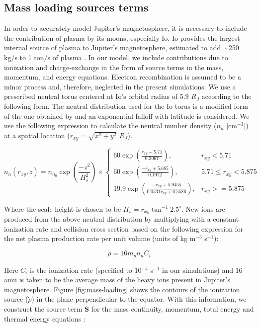 \subsection{Mass loading sources terms}
In order to accurately model Jupiter's magnetosphere, it is necessary to include the contribution of plasma by its moons, especially Io. Io provides the largest internal source of plasma to Jupiter's magnetosphere, estimated to add $\sim$250 kg/s to 1 ton/s of plasma \cite{Bagenal2011b}. In our model, we include contributions due to ionization and charge‐exchange in the form of source terms in the mass, momentum, and energy equations. Electron recombination is assumed to be a minor process and, therefore, neglected in the present simulations. We use a prescribed neutral torus centered at Io's orbital radius of 5.9 $R_J$ according to the following form. The neutral distribution used for the Io torus is a modified form of the one obtained by  and an exponential falloff with latitude is considered. We use the following expression to calculate the neutral number density ($n_n$ [cm$^{-3}$]) at a spatial location ($r_{xy} = \sqrt{x^2 + y^2}$ $R_J$). 

\begin{equation}
    n_n \left(r_{xy}, z\right) = n_{n_0} \exp{\left(\frac{-z^2}{H_s^2}\right)}\times 
    \begin{cases}
        60 \exp\left( \frac{r_{xy} - 5.71}{0.2067}\right), & r_{xy} < 5.71\\
        60 \exp\left( \frac{-r_{xy} + 5.685}{0.1912}\right), &
        5.71 \leq r_{xy} < 5.875\\
        19.9 \exp\left( \frac{-r_{xy} + 5.9455}{0.0531 r_{xy} + 0.5586 }\right), &r_{xy} >= 5.875
    \end{cases}
\end{equation}

Where the scale height is chosen to be $H_s = r_{xy} \tan^{-1}2.5^\circ$. New ions are produced from the above neutral distribution by multiplying with a constant ionization rate and collision cross section based on the following expression for the net plasma production rate per unit volume (units of kg m$^{-3}$ s$^{-1}$):

\begin{equation}
    \dot{\rho} = 16 m_p n_n C_i
\end{equation}

Here $C_i$ is the ionization rate (specified to 10$^{-4}$ s$^{-1}$ in our simulations) and 16 amu is taken to be the average mass of the heavy ions present in Jupiter's magnetosphere. Figure \ref{fig:mass-loading} shows the contours of the ionization source ($\dot{\rho}$) in the plane perpendicular to the equator. With this information, we construct the source term $\mathbf{S}$ for the mass continuity, momentum, total energy and thermal energy equations \cite{Hansen2001a, Gombosi1996Three-dimensionalEnvironments}: 

